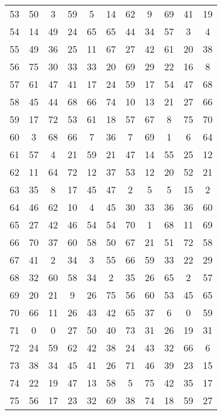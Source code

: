 \begin{table}
\begin{tabular}{c c c c c c c c c c c }
53 & 50 & 3 & 59 & 5 & 14 & 62 & 9 & 69 & 41 & 19 \\
54 & 14 & 49 & 24 & 65 & 65 & 44 & 34 & 57 & 3 & 4 \\
55 & 49 & 36 & 25 & 11 & 67 & 27 & 42 & 61 & 20 & 38 \\
56 & 75 & 30 & 33 & 33 & 20 & 69 & 29 & 22 & 16 & 8 \\
57 & 61 & 47 & 41 & 17 & 24 & 59 & 17 & 54 & 47 & 68 \\
58 & 45 & 44 & 68 & 66 & 74 & 10 & 13 & 21 & 27 & 66 \\
59 & 17 & 72 & 53 & 61 & 18 & 57 & 67 & 8 & 75 & 70 \\
60 & 3 & 68 & 66 & 7 & 36 & 7 & 69 & 1 & 6 & 64 \\
61 & 57 & 4 & 21 & 59 & 21 & 47 & 14 & 55 & 25 & 12 \\
62 & 11 & 64 & 72 & 12 & 37 & 53 & 12 & 20 & 52 & 21 \\
63 & 35 & 8 & 17 & 45 & 47 & 2 & 5 & 5 & 15 & 2 \\
64 & 46 & 62 & 10 & 4 & 45 & 30 & 33 & 36 & 36 & 60 \\
65 & 27 & 42 & 46 & 54 & 54 & 70 & 1 & 68 & 11 & 69 \\
66 & 70 & 37 & 60 & 58 & 50 & 67 & 21 & 51 & 72 & 58 \\
67 & 41 & 2 & 34 & 3 & 55 & 66 & 59 & 33 & 22 & 29 \\
68 & 32 & 60 & 58 & 34 & 2 & 35 & 26 & 65 & 2 & 57 \\
69 & 20 & 21 & 9 & 26 & 75 & 56 & 60 & 53 & 45 & 65 \\
70 & 66 & 11 & 26 & 43 & 42 & 65 & 37 & 6 & 0 & 59 \\
71 & 0 & 0 & 27 & 50 & 40 & 73 & 31 & 26 & 19 & 31 \\
72 & 24 & 59 & 62 & 42 & 38 & 24 & 43 & 32 & 66 & 6 \\
73 & 38 & 34 & 45 & 41 & 26 & 71 & 46 & 39 & 23 & 15 \\
74 & 22 & 19 & 47 & 13 & 58 & 5 & 75 & 42 & 35 & 17 \\
75 & 56 & 17 & 23 & 32 & 69 & 38 & 74 & 18 & 59 & 27 \\
\hline
\end{tabular}
\end{table}